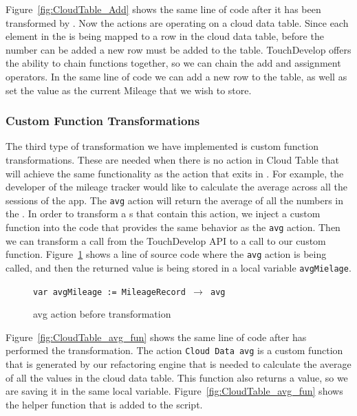 \documentclass{sigplanconf}
\begin{document}
Figure~\ref{fig:CloudTable_Add} shows the same line of code after it has been transformed by  \tool.  Now the actions are operating on a cloud data table.  Since each element in the \NC{} is being mapped to a row in the cloud data table, before the number can be added a new row must be added to the table.  TouchDevelop offers the ability to chain functions together, so we can chain the add and assignment operators.  In the same line of code we can add a new row to the table, as well as set the value as the current Mileage that we wish to store.


\subsubsection{Custom Function Transformations}
The third type of transformation we have implemented is custom function transformations.  These are needed when there is no action in Cloud Table that will achieve the same functionality as the action that exits in  \NC{}. For example, the developer of the mileage tracker would like to calculate the average across all the sessions of the app.  The \texttt{avg} action will return the average of all the numbers in the \NC{}.  In order to transform a \NC{}s that contain this action, we inject a custom function into the code that provides the same behavior as the \texttt{avg} action.  Then we can transform a call from the TouchDevelop API to a call to our custom function.  Figure~\ref{fig:numCol_avg} shows a line of source code where the \texttt{avg} action is being called, and then the returned value is being stored in a local variable \texttt{avgMielage}.


\begin{figure}[htbp!]
\begin{center}
\texttt{var avgMileage := MileageRecord $\rightarrow$ avg}
\nocaptionrule
\caption{avg action before transformation}
\label{fig:numCol_avg}
\end{center}
\end{figure}

Figure~\ref{fig:CloudTable_avg_fun} shows the same line of code after \tool has performed the transformation.  The action \texttt{Cloud Data avg} is a custom function that is generated by our refactoring engine that is needed to calculate the average of all the values in the cloud data table.  This function also returns a value, so we are saving it in the same local variable.  Figure~\ref{fig:CloudTable_avg_fun} shows the helper function that is added to the script.
\end{document}
